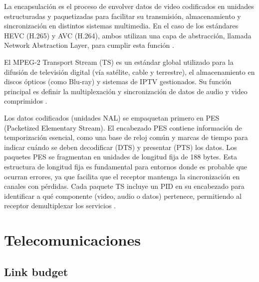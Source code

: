 \documentclass[12pt,a4paper]{article}
\begin{document}
La encapsulación es el proceso de envolver datos de video codificados en unidades estructuradas y paquetizadas para facilitar su transmisión, almacenamiento y sincronización en distintos sistemas multimedia. En el caso de los estándares HEVC (H.265) y AVC (H.264), ambos utilizan una capa de abstracción, llamada Network Abstraction Layer, para cumplir esta función \cite{ref26}.

El MPEG-2 Transport Stream (TS) es un estándar global utilizado para la difusión de televisión digital (vía satélite, cable y terrestre), el almacenamiento en discos ópticos (como Blu-ray) y sistemas de IPTV gestionados. Su función principal es definir la multiplexación y sincronización de datos de audio y video comprimidos \cite{ref26}.

Los datos codificados (unidades NAL) se empaquetan primero en PES (Packetized Elementary Stream). El encabezado PES contiene información de temporización esencial, como una base de reloj común y marcas de tiempo para indicar cuándo se deben decodificar (DTS) y presentar (PTS) los datos. Los paquetes PES se fragmentan en unidades de longitud fija de 188 bytes. Esta estructura de longitud fija es fundamental para entornos donde es probable que ocurran errores, ya que facilita que el receptor mantenga la sincronización en canales con pérdidas. Cada paquete TS incluye un PID en su encabezado para identificar a qué componente (video, audio o datos) pertenece, permitiendo al receptor demultiplexar los servicios \cite{ref26}.


\newpage

\section{Telecomunicaciones}\label{tecnologias-de-comunicacion}

\subsection{Link budget}\label{link-budget-marco}
\end{document}
